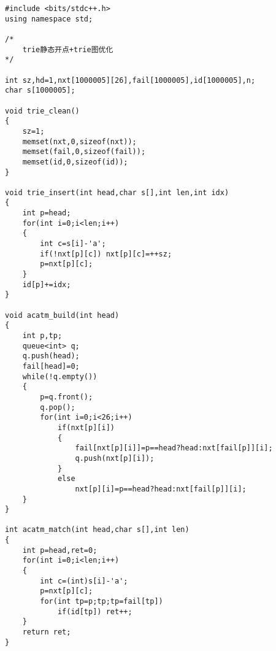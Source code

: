 \begin{lstlisting}
#include <bits/stdc++.h>
using namespace std;

/*
	trie静态开点+trie图优化
*/

int sz,hd=1,nxt[1000005][26],fail[1000005],id[1000005],n;
char s[1000005];

void trie_clean()
{
    sz=1;
    memset(nxt,0,sizeof(nxt));
    memset(fail,0,sizeof(fail));
    memset(id,0,sizeof(id));
}

void trie_insert(int head,char s[],int len,int idx)
{
    int p=head;
    for(int i=0;i<len;i++)
    {
        int c=s[i]-'a';
        if(!nxt[p][c]) nxt[p][c]=++sz;
        p=nxt[p][c];
    }
    id[p]+=idx;
}

void acatm_build(int head)
{
    int p,tp;
    queue<int> q;
    q.push(head);
    fail[head]=0;
    while(!q.empty())
    {
        p=q.front();
        q.pop();
        for(int i=0;i<26;i++)
            if(nxt[p][i])
            {
                fail[nxt[p][i]]=p==head?head:nxt[fail[p]][i];
                q.push(nxt[p][i]);
            }
            else
                nxt[p][i]=p==head?head:nxt[fail[p]][i];
    }    
}

int acatm_match(int head,char s[],int len)
{
    int p=head,ret=0;
    for(int i=0;i<len;i++)
    {
        int c=(int)s[i]-'a';
        p=nxt[p][c];
        for(int tp=p;tp;tp=fail[tp])
            if(id[tp]) ret++;
    }
    return ret;
}
\end{lstlisting}